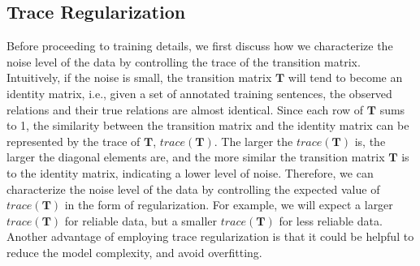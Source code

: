
\subsection{Trace Regularization}
Before proceeding to training details, we first discuss how we characterize the noise level of the data by controlling the trace of the transition matrix.
Intuitively, if the noise is small, the transition matrix $\mathbf{T}$ will tend to become an identity matrix, i.e., given a set of annotated training sentences,  the observed relations and their true relations are almost identical. Since each row of $\mathbf{T}$ sums to 1, the similarity between the transition matrix and the identity matrix can be represented by the trace of $\mathbf{T}$, $trace (\mathbf{T})$. The larger the $trace(\mathbf{T})$ is, the larger the diagonal elements are, and the more similar the transition matrix $\mathbf{T}$ is to the identity matrix, indicating a lower level of noise. Therefore, we can characterize  the noise level of the data by controlling the expected value of $trace(\mathbf{T})$ in the form of regularization. For example, we will expect a larger $trace (\mathbf{T})$ for reliable data, but  a smaller $trace(\mathbf{T})$  for less reliable data. Another advantage of employing trace regularization is that it could be helpful to reduce the model complexity,  %
and avoid overfitting.


